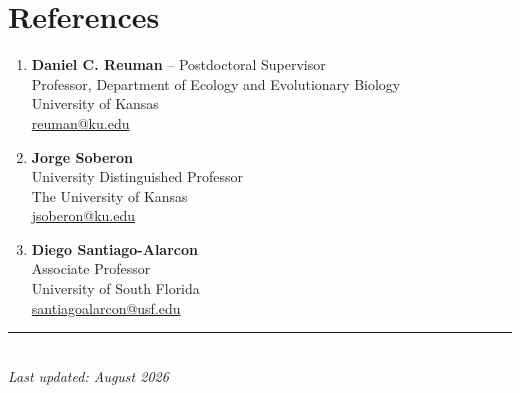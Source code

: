 \documentclass[11pt,a4paper]{article}
\begin{document}
\section*{References}

\begin{enumerate}[leftmargin=0pt]
\item \textbf{Daniel C. Reuman} -- Postdoctoral Supervisor \\
      Professor, Department of Ecology and Evolutionary Biology \\
      University of Kansas \\
      \href{mailto:reuman@ku.edu}{reuman@ku.edu}

\item \textbf{Jorge Soberon} \\
      University Distinguished Professor \\
      The University of Kansas \\
      \href{mailto:jsoberon@ku.edu}{jsoberon@ku.edu}

\item \textbf{Diego Santiago-Alarcon}  \\
      Associate Professor\\
      University of South Florida \\
      \href{mailto:santiagoalarcon@usf.edu}{santiagoalarcon@usf.edu}
\end{enumerate}

\vfill
\noindent\rule{\linewidth}{0.4pt}\\
\textit{Last updated: August 2026}
\end{document}
